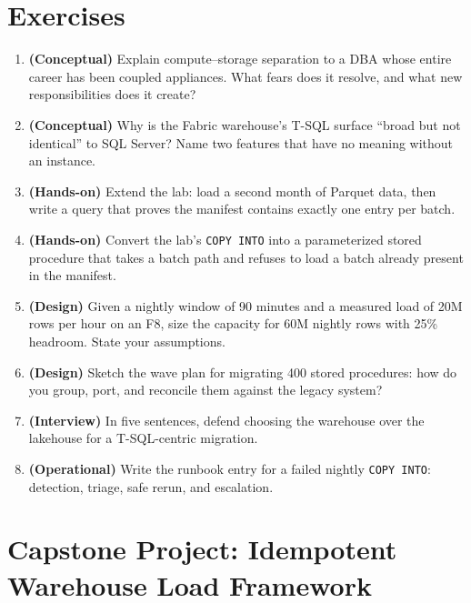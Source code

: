 \section{Exercises}
\begin{enumerate}
    \item \textbf{(Conceptual)} Explain compute--storage separation to a DBA whose entire career has been coupled appliances. What fears does it resolve, and what new responsibilities does it create?
    \item \textbf{(Conceptual)} Why is the Fabric warehouse's T-SQL surface ``broad but not identical'' to SQL Server? Name two features that have no meaning without an instance.
    \item \textbf{(Hands-on)} Extend the lab: load a second month of Parquet data, then write a query that proves the manifest contains exactly one entry per batch.
    \item \textbf{(Hands-on)} Convert the lab's \texttt{COPY INTO} into a parameterized stored procedure that takes a batch path and refuses to load a batch already present in the manifest.
    \item \textbf{(Design)} Given a nightly window of 90 minutes and a measured load of 20M rows per hour on an F8, size the capacity for 60M nightly rows with 25\% headroom. State your assumptions.
    \item \textbf{(Design)} Sketch the wave plan for migrating 400 stored procedures: how do you group, port, and reconcile them against the legacy system?
    \item \textbf{(Interview)} In five sentences, defend choosing the warehouse over the lakehouse for a T-SQL-centric migration.
    \item \textbf{(Operational)} Write the runbook entry for a failed nightly \texttt{COPY INTO}: detection, triage, safe rerun, and escalation.
\end{enumerate}

\section{Capstone Project: Idempotent Warehouse Load Framework}\label{sec:ch5-capstone}

